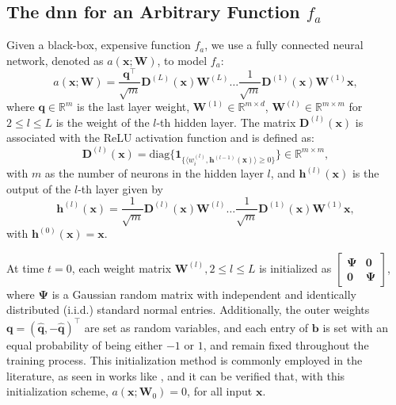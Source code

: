 \subsection{The \acl{dnn} for an Arbitrary Function $f_a$}
\label{section:arbitrary_nn}
Given a black-box, expensive function $f_a$, we use a fully connected neural network, denoted as $a(\mathbf{x}; \mathbf{W})$, to model $f_a$:
\begin{equation}
\label{eqn:fcn}
    a(\mathbf{x}; \mathbf{W}) = \frac{\mathbf{q}^\top}{\sqrt{m}} \mathbf{D}^{(L)}(\mathbf{x}) \mathbf{W}^{(L)} \dots \frac{1}{\sqrt{m}} \mathbf{D}^{(1)}(\mathbf{x}) \mathbf{W}^{(1)} \mathbf{x}, 
\end{equation}
where $\mathbf{q} \in \mathbb{R}^m$ is the last layer weight, $\mathbf{W}^{(1)} \in \mathbb{R}^{m \times d}$, $\mathbf{W}^{(l)} \in \mathbb{R}^{m \times m}$ for $2 \leq l \leq L$ is the weight of the $l$-th hidden layer. The matrix $\mathbf{D}^{(l)}(\mathbf{x})$ is associated with the ReLU activation function and is defined as:
\begin{equation*}
    \mathbf{D}^{(l)}(\mathbf{x}) = \text{diag}\{\mathbf{1}_{ \{ \langle w_i^{(l)}, \mathbf{h}^{(l-1)}(\mathbf{x})  \rangle \ge 0 \} } \} \in \mathbb{R}^{m \times m},
\end{equation*}
with $m$ as the number of neurons in the hidden layer $l$, and $\mathbf{h}^{(l)}(\mathbf{x})$ is the output of the $l$-th layer given by 
\begin{equation*}
    \mathbf{h}^{(l)}(\mathbf{x}) = \frac{1}{\sqrt{m}} \mathbf{D}^{(l)}(\mathbf{x}) \mathbf{W}^{(l)} \dots \frac{1}{\sqrt{m}} \mathbf{D}^{(1)}(\mathbf{x}) \mathbf{W}^{(1)} \mathbf{x},
\end{equation*}
with $\mathbf{h}^{(0)}(\mathbf{x}) = \mathbf{x}$. 

At time $t=0$, each weight matrix $\mathbf{W}^{(l)},  2 \le l \le L$ is initialized as $\begin{bmatrix}
\boldsymbol{\Psi} & \mathbf{0}  \\
\mathbf{0} & \boldsymbol{\Psi}
\end{bmatrix}
$, where $\boldsymbol{\Psi}$ is a Gaussian random matrix with independent and identically distributed (i.i.d.) standard normal entries. Additionally, the outer weights $\mathbf{q} = (\hat{\mathbf{q}}, -\hat{\mathbf{q}})^\top$  are set as random variables, and each entry of $\mathbf{b}$ is set with an equal probability of being either $-1$ or $1$, and remain fixed throughout the training process. This initialization method is commonly employed in the literature, as seen in works like \citet{du2018gradient, arora2019fine}, and it
can be verified that, with this initialization scheme, $a(\mathbf{x}; \mathbf{W}_0) = 0$, for all input $\mathbf{x}$. 

